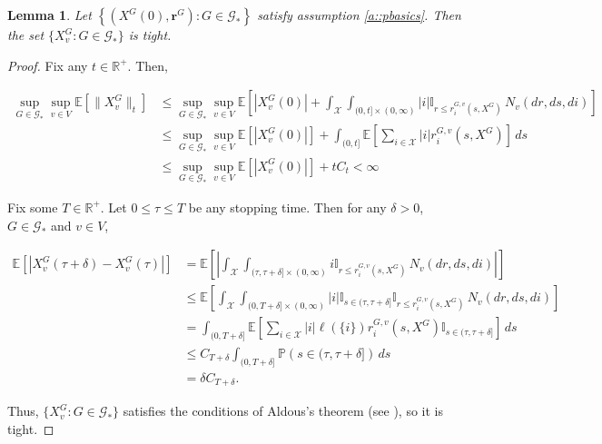 \documentclass[12pt]{article}
\newcommand{\mb}{\mathbb}
\newcommand{\mc}{\mathcal}
\newcommand{\pr}{\mb{P}}							%
\newcommand{\ex}[1]{\mb{E}\left[#1\right]}			%
\newcommand{\sta}{\mc{X}}							%
\newcommand{\Xf}{X}									%
\newcommand{\poiss}{N}								%
\newcommand{\Sm}{\ell}								%
\newcommand{\rate}{r}								%
\newcommand{\poissv}[1]{_{#1}}						%
\newcommand{\vind}[1]{_{#1}}						%
\newcommand{\tme}[1]{(#1)}							%
\newcommand{\gind}[1]{^{#1}}						%
\newcommand{\stpara}[1]{_{#1}}						%
\newcommand{\tpara}[1]{_{#1}}						%
\newcommand{\gvpara}[2]{^{#1,#2}}					%
\newcommand{\rateset}{\mathbf{\rate}}				%
\newcommand{\jumpbd}[1]{C_{#1}}						%
\newcommand{\tmepro}[2]{(#1,#2)}					%
\newcommand{\Gs}{\mc{G}_\ast}						%
\newcommand{\rt}{\tau}								%
\newtheorem{lem}[thms]{Lemma}
\begin{document}
\begin{lem}
Let \(\left\{(\Xf\gind{G}\tme{0},\rateset\gind{G}):G \in \Gs\right\}\) satisfy assumption \ref{a::pbasics}. Then the set \(\{\Xf\gind{G}\vind{v}:G \in \Gs\}\) is tight.
\label{lwc::tight}
\end{lem}
\begin{proof}
Fix any \(t \in \mb{R}^+\). Then,

\begin{align*}
\sup_{G\in \Gs}\sup_{v \in V} \ex{\|\Xf\gind{G}\vind{v}\|\tpara{t}} &\leq \sup_{G\in \Gs}\sup_{v \in V}\ex{|\Xf\gind{G}\vind{v}\tme{0}| + \int_\sta\int_{(0,t]\times(0,\infty)} |i|\mb{I}_{r \leq \rate\gvpara{G}{v}\stpara{i}\tmepro{s}{\Xf\gind{G}}}\,\poiss\poissv{v}(dr,ds,di)}\\
&\leq \sup_{G\in \Gs}\sup_{v \in V}\ex{|\Xf\gind{G}\vind{v}\tme{0}|} + \int_{(0,t]}\ex{\sum_{i\in \sta}|i|\rate\gvpara{G}{v}\stpara{i}\tmepro{s}{\Xf\gind{G}}}\,ds\\
&\leq \sup_{G\in \Gs}\sup_{v \in V}\ex{|\Xf\gind{G}\vind{v}\tme{0}|} + t\jumpbd{t} < \infty
\end{align*}

Fix some \(T \in \mb{R}^+\). Let \(0 \leq \rt \leq T\) be any stopping time. Then for any \(\delta > 0\), \(G \in \Gs\) and \(v \in V\),

\begin{align*}
\ex{\left|\Xf\gind{G}\vind{v}\tme{\rt + \delta} - \Xf\gind{G}\vind{v}\tme{\rt}\right|} &= \ex{\left|\int_\sta\int_{(\rt,\rt+\delta]\times (0,\infty)} i\mb{I}_{r \leq \rate\gvpara{G}{v}\stpara{i}\tmepro{s}{\Xf\gind{G}}}\,\poiss\poissv{v}(dr,ds,di)\right|}\\
&\leq \ex{\int_\sta\int_{(0,T+\delta]\times (0,\infty)} |i|\mb{I}_{s \in (\rt,\rt+\delta]}\mb{I}_{r \leq \rate\gvpara{G}{v}\stpara{i}\tmepro{s}{\Xf\gind{G}}}\,\poiss\poissv{v}(dr,ds,di)}\\
&= \int_{(0,T + \delta]}\ex{\sum_{i\in \sta} |i|\Sm(\{i\})\rate\gvpara{G}{v}\stpara{i}\tmepro{s}{\Xf\gind{G}}\mb{I}_{s \in (\rt,\rt+\delta]}}\,ds\\
&\leq \jumpbd{T+\delta}\int_{(0,T+\delta]} \pr\left(s \in (\rt,\rt+\delta]\right)\,ds\\
&= \delta\jumpbd{T + \delta}.
\end{align*}

Thus, \(\{\Xf\gind{G}\vind{v}:G \in \Gs\}\) satisfies the conditions of Aldous's theorem (see \cite[Theorem 16.10]{Bil99}), so it is tight.
\end{proof}
\end{document}

